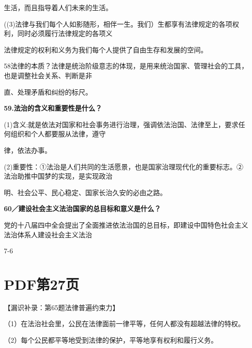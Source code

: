 \documentclass[lang=cn,11pt]{elegantbook}
\newcommand{\daofasym}[1]{{\daofasymbolfont #1}}
\newcommand{\daofasym}[1]{#1}
\begin{document}
生活，而且指导着人们未来的生活。\par

((3)法律与我们每个人如影随形，相伴一生。我们）生都享有法律规定的各项权利，同时必须履行法律规定的各项义\par

法律规定的权利和义务为我们每个人提供了自由生存和发展的空间。\par

58法律的本质？法律是统治阶级意志的体现，是用来统治国家、管理社会的工具，也是调整社会关系、判断是非\par

直、处理矛盾和纠纷的标尺。\par

\textbf{59.法治的含义和重要性是什么？}\par

(1)含义:就是依法对国家和社会事务进行治理，强调依法治国、法律至上，要求任何组织和个人都要服从法律，遵守\par

律，依法办事。\par

(2)重要性：\daofasym{①}法治是人们共同的生活愿景，也是国家治理现代化的重要标志。\daofasym{②}法治助推中国梦的实现，是实现政治\par

明、社会公平、民心稳定、国家长治久安的必由之路。\par

\textbf{60／建设社会主义法治国家的总目标和意义是什么？}\par

党的十八届四中全会提出了全面推进依法治国的总目标，即建设中国特色社会主义法治体系人建设社会主义法治\par

7-6\par


\section*{PDF第27页}

【漏识补录：第65题法律普遍约束力】\par

（1）在法治社会里，公民在法律面前一律平等，任何人都没有超越法律的特权。\par

（2）每个公民都平等地受到法律的保护，平等地享有权利和履行义务。\par
\end{document}
